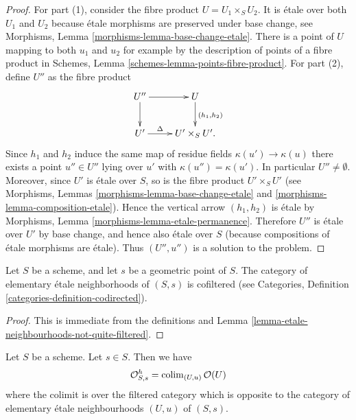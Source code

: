 \begin{proof}
For part (1), consider the fibre product $U = U_1 \times_S U_2$.
It is \'etale over both $U_1$ and $U_2$ because \'etale morphisms are
preserved under base change, see
Morphisms, Lemma \ref{morphisms-lemma-base-change-etale}.
There is a point of $U$ mapping to both $u_1$ and $u_2$ for example
by the description of points of a fibre product in
Schemes, Lemma \ref{schemes-lemma-points-fibre-product}.
For part (2), define $U''$ as the fibre product
$$
\xymatrix{
U'' \ar[r] \ar[d] & U \ar^{(h_1, h_2)}[d] \\
U' \ar^-\Delta[r] & U' \times_S U'.
}
$$
Since $h_1$ and $h_2$ induce the same map of residue fields
$\kappa(u') \to \kappa(u)$ there exists a point $u'' \in U''$
lying over $u'$ with $\kappa(u'') = \kappa(u')$.
In particular $U'' \not = \emptyset$.
Moreover, since $U'$ is \'etale over $S$, so is the fibre product
$U'\times_S U'$ (see
Morphisms, Lemmas \ref{morphisms-lemma-base-change-etale} and
\ref{morphisms-lemma-composition-etale}).
Hence the vertical arrow $(h_1, h_2)$ is \'etale by
Morphisms, Lemma \ref{morphisms-lemma-etale-permanence}.
Therefore $U''$ is \'etale over $U'$ by base change, and hence also
\'etale over $S$ (because compositions of \'etale morphisms are \'etale).
Thus $(U'', u'')$ is a solution to the problem.
\end{proof}

\begin{lemma}
\label{lemma-elementary-etale-neighbourhoods}
Let $S$ be a scheme, and let $s$ be a geometric point of $S$.
The category of elementary \'etale neighborhoods of $(S, s)$
is cofiltered (see
Categories, Definition \ref{categories-definition-codirected}).
\end{lemma}

\begin{proof}
This is immediate from the definitions and
Lemma \ref{lemma-etale-neighbourhoods-not-quite-filtered}.
\end{proof}

\begin{lemma}
\label{lemma-describe-henselization}
Let $S$ be a scheme. Let $s \in S$. Then we have
$$
\mathcal{O}_{S, s}^h =
\mathop{\rm colim}\nolimits_{(U, u)} \mathcal{O}(U)
$$
where the colimit is over the filtered category which is opposite to the
category of elementary \'etale neighbourhoods $(U, u)$ of $(S, s)$.
\end{lemma}

